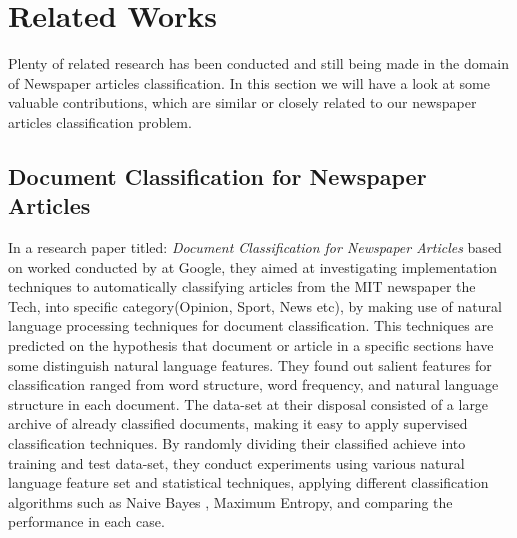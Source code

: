 \chapter{Related Works}
Plenty of related research has been conducted and still being made in the domain of Newspaper articles classification. In this section we will have a look at some valuable contributions, which are similar or closely related to our newspaper articles classification problem.  

\section{Document Classification for Newspaper Articles}
In a research paper titled: \textit{Document Classification for Newspaper Articles} based on worked conducted by \cite{Ramdass2009} at Google, they aimed at investigating implementation techniques to automatically classifying articles from the MIT newspaper the Tech, into specific category(Opinion, Sport, News etc), by making use of natural language processing techniques for document classification. This techniques are predicted on the hypothesis that document or article in a specific sections have some distinguish natural language features. They found out salient features for classification ranged from word structure, word frequency, and natural language structure in each document. The data-set at their disposal consisted of a large archive of  already classified documents, making it easy to apply supervised classification techniques.
By randomly dividing their classified achieve into training and test data-set, they conduct experiments using various natural language feature set and statistical techniques, applying different classification algorithms such as Naive Bayes , Maximum Entropy, and comparing the performance in each case.  

